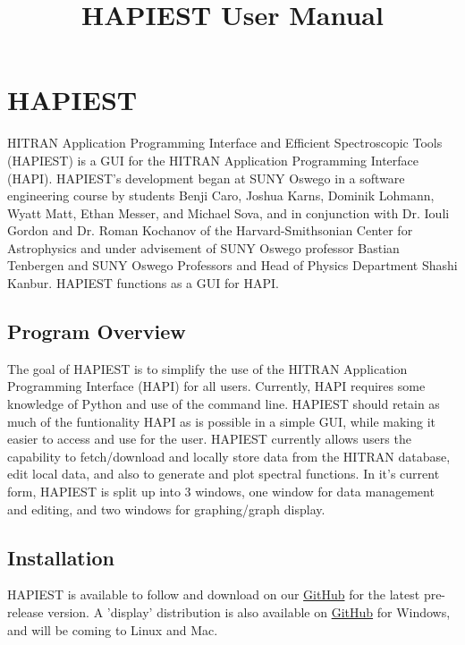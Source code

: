 \documentclass[12pt]{article}
\begin{document}
\title{HAPIEST User Manual} 
\date{}
\maketitle
\thispagestyle{empty}
\newpage
\tableofcontents
\thispagestyle{empty}
\newpage
\setcounter{page}{1}

\section{HAPIEST}
HITRAN Application Programming Interface and Efficient Spectroscopic Tools (HAPIEST) is a GUI for the HITRAN Application Programming Interface (HAPI). HAPIEST's development began at SUNY Oswego in a software engineering course by students Benji Caro, Joshua Karns, Dominik Lohmann, Wyatt Matt, Ethan Messer, and Michael Sova, and in conjunction with Dr. Iouli Gordon and Dr. Roman Kochanov of the Harvard-Smithsonian Center for Astrophysics and under advisement of SUNY Oswego professor Bastian Tenbergen and SUNY Oswego Professors and Head of Physics Department Shashi Kanbur. HAPIEST functions as a GUI for HAPI.

\subsection{Program Overview}
The goal of HAPIEST is to simplify the use of the HITRAN Application Programming Interface (HAPI) for all users. Currently, HAPI requires some knowledge of Python and use of the command line. HAPIEST should retain as much of the funtionality HAPI as is possible in a simple GUI, while making it easier to access and use for the user. HAPIEST currently allows users the capability to fetch/download and locally store data from the HITRAN database, edit local data, and also to generate and plot spectral functions. In it's current form, HAPIEST is split up into 3 windows, one window for data management and editing, and two windows for graphing/graph display.

\subsection{Installation}
HAPIEST is available to follow and download on our \href{https://github.com/hitranonline/hapiest}{GitHub} for the latest pre-release version. A 'display' distribution is also available on \href{https://github.com/hitranonline/hapiest/releases}{GitHub} for Windows, and will be coming to Linux and Mac.
\end{document}
